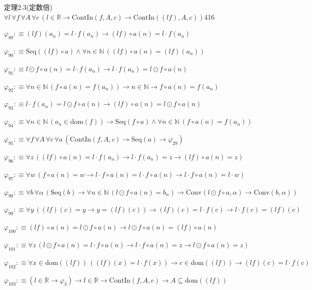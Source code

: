 \begin{fullproof}{定理2.3(定数倍)}{$\forall l\,\forall f\,\forall A\,\forall c\,(l \in \mathbb{R} \to \mathrm{ContIn}(f,A,c) \to \mathrm{ContIn}((l f),A,c))$}{416}
\begin{abbrevlist}
\item $\varphi_{89} :\equiv (l f)(a_{n}) = l \cdot f(a_{n}) \to (l f) \circ a(n) = l \cdot f(a_{n})$
\item $\varphi_{90} :\equiv \mathrm{Seq}((l f) \circ a) \land \forall n \in \mathbb{N}\,((l f) \circ a(n) = (l f)(a_{n}))$
\item $\varphi_{91} :\equiv l \odot f \circ a(n) = l \cdot f(a_{n}) \to l \cdot f(a_{n}) = l \odot f \circ a(n)$
\item $\varphi_{92} :\equiv \forall n \in \mathbb{N}\,(f \circ a(n) = f(a_{n})) \to n \in \mathbb{N} \to f \circ a(n) = f(a_{n})$
\item $\varphi_{93} :\equiv l \cdot f(a_{n}) = l \odot f \circ a(n) \to (l f) \circ a(n) = l \odot f \circ a(n)$
\item $\varphi_{94} :\equiv \forall n \in \mathbb{N}\,(a_{n} \in \mathrm{dom}(f)) \to \mathrm{Seq}(f \circ a) \land \forall n \in \mathbb{N}\,(f \circ a(n) = f(a_{n}))$
\item $\varphi_{95} :\equiv \forall f\,\forall A\,\forall c\,\forall a\,(\mathrm{ContIn}(f,A,c) \to \mathrm{Seq}(a) \to \varphi_{29})$
\item $\varphi_{96} :\equiv \forall z\,((l f) \circ a(n) = l \cdot f(a_{n}) \to l \cdot f(a_{n}) = z \to (l f) \circ a(n) = z)$
\item $\varphi_{97} :\equiv \forall w\,(f \circ a(n) = w \to l \cdot f \circ a(n) = l \cdot f \circ a(n) \to l \cdot f \circ a(n) = l \cdot w)$
\item $\varphi_{98} :\equiv \forall b\,\forall \alpha\,(\mathrm{Seq}(b) \to \forall n \in \mathbb{N}\,(l \odot f \circ a(n) = b_{n}) \to \mathrm{Conv}(l \odot f \circ a,\alpha) \to \mathrm{Conv}(b,\alpha))$
\item $\varphi_{99} :\equiv \forall y\,((l f)(c) = y \to y = (l f)(c)) \to (l f)(c) = l \cdot f(c) \to l \cdot f(c) = (l f)(c)$
\item $\varphi_{100} :\equiv (l f) \circ a(n) = l \odot f \circ a(n) \to l \odot f \circ a(n) = (l f) \circ a(n)$
\item $\varphi_{101} :\equiv \forall z\,(l \odot f \circ a(n) = l \cdot f \circ a(n) \to l \cdot f \circ a(n) = z \to l \odot f \circ a(n) = z)$
\item $\varphi_{102} :\equiv \forall x \in \mathrm{dom}((l f))\,((l f)(x) = l \cdot f(x)) \to c \in \mathrm{dom}((l f)) \to (l f)(c) = l \cdot f(c)$
\item $\varphi_{103} :\equiv (l \in \mathbb{R} \to \varphi_{3}) \to l \in \mathbb{R} \to \mathrm{ContIn}(f,A,c) \to A \subseteq \mathrm{dom}((l f))$

\end{abbrevlist}
\end{fullproof}
